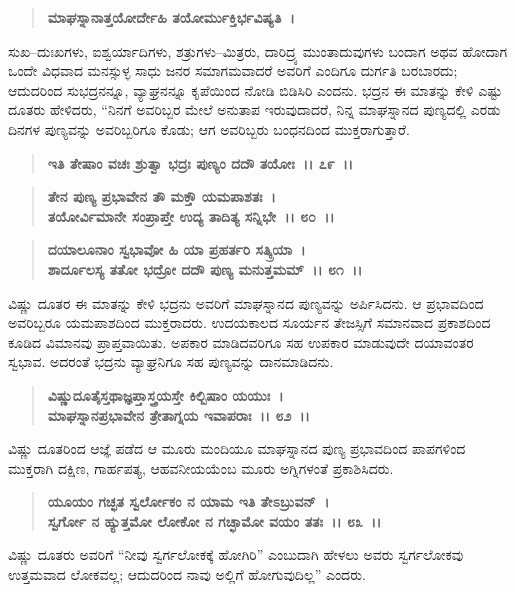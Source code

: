 \begin{verse}
\textbf{ಮಾಘಸ್ನಾನಾತ್ತಯೋರ್ದೇಹಿ ತಯೋರ್ಮುಕ್ತಿರ್ಭವಿಷ್ಯತಿ~।}
\end{verse}

ಸುಖ–ದುಃಖಗಳು, ಐಶ್ವರ್ಯಾದಿಗಳು, ಶತ್ರುಗಳು–ಮಿತ್ರರು, ದಾರಿದ್ರ್ಯ ಮುಂತಾದುವುಗಳು ಬಂದಾಗ ಅಥವ ಹೋದಾಗ ಒಂದೇ ವಿಧವಾದ ಮನಸ್ಸುಳ್ಳ ಸಾಧು ಜನರ ಸಮಾಗಮವಾದರೆ ಅವರಿಗೆ ಎಂದಿಗೂ ದುರ್ಗತಿ ಬರಬಾರದು; ಆದುದರಿಂದ ಸುಭದ್ರನನ್ನೂ, ವ್ಯಾಘ್ರನನ್ನೂ ಕೃಪೆಯಿಂದ ನೋಡಿ ಬಿಡಿಸಿರಿ ಎಂದನು. ಭದ್ರನ ಈ ಮಾತನ್ನು ಕೇಳಿ ಎಷ್ಟು ದೂತರು ಹೇಳಿದರು, “ನಿನಗೆ ಅವರಿಬ್ಬರ ಮೇಲೆ ಅನುತಾಪ ಇರುವುದಾದರೆ, ನಿನ್ನ ಮಾಘಸ್ನಾನದ ಪುಣ್ಯದಲ್ಲಿ ಎರಡು ದಿನಗಳ ಪುಣ್ಯವನ್ನು ಅವರಿಬ್ಬರಿಗೂ ಕೊಡು; ಆಗ ಅವರಿಬ್ಬರು ಬಂಧನದಿಂದ ಮುಕ್ತರಾಗುತ್ತಾರೆ.

\begin{verse}
\textbf{ಇತಿ ತೇಷಾಂ ವಚಃ ಶ್ರುತ್ವಾ ಭದ್ರಃ ಪುಣ್ಯಂ ದದೌ ತಯೋಃ~।। ೭೯~।।} 
\end{verse}

\begin{verse}
\textbf{ತೇನ ಪುಣ್ಯ ಪ್ರಭಾವೇನ ತೌ ಮಕ್ತೌ ಯಮಪಾಶತಃ~।}\\\textbf{ತಯೋರ್ವಿಮಾನೇ ಸಂಪ್ರಾಪ್ತೇ ಉದ್ಯ ತಾದಿತ್ಯ ಸನ್ನಿಭೇ~।। ೮೦~।। }
\end{verse}

\begin{verse}
\textbf{ದಯಾಲೂನಾಂ ಸ್ವಭಾವೋ ಹಿ ಯಾ ಪ್ರಹರ್ತರಿ ಸತ್ಕ್ರಿಯಾ~।}\\\textbf{ಶಾರ್ದೂಲಸ್ಯ ತತೋ ಭದ್ರೋ ದದೌ ಪುಣ್ಯ ಮನುತ್ತಮಮ್~।। ೮೧~।।}
\end{verse}

ವಿಷ್ಣು ದೂತರ ಈ ಮಾತನ್ನು ಕೇಳಿ ಭದ್ರನು ಅವರಿಗೆ ಮಾಘಸ್ನಾನದ ಪುಣ್ಯವನ್ನು ಅರ್ಪಿಸಿದನು. ಆ ಪ್ರಭಾವದಿಂದ ಅವರಿಬ್ಬರೂ ಯಮಪಾಶದಿಂದ ಮುಕ್ತರಾದರು. ಉದಯಕಾಲದ ಸೂರ್ಯನ ತೇಜಸ್ಸಿಗೆ ಸಮಾನವಾದ ಪ್ರಕಾಶದಿಂದ ಕೂಡಿದ ವಿಮಾನವು ಪ್ರಾಪ್ತವಾಯಿತು. ಅಪಕಾರ ಮಾಡಿದವರಿಗೂ ಸಹ ಉಪಕಾರ ಮಾಡುವುದೇ ದಯಾವಂತರ ಸ್ವಭಾವ. ಅದರಂತೆ ಭದ್ರನು ವ್ಯಾಘ್ರನಿಗೂ ಸಹ ಪುಣ್ಯವನ್ನು ದಾನಮಾಡಿದನು.

\begin{verse}
\textbf{ವಿಷ್ಣುದೂತೈಸ್ತಥಾಜ್ಞಪ್ತಾಸ್ತ್ರಯಸ್ತೇ ಕಿಲ್ಬಿಷಾಂ ಯಯುಃ~।}\\\textbf{ಮಾಘಸ್ನಾನಪ್ರಭಾವೇನ ತ್ರೇತಾಗ್ನಯ ಇವಾಪರಾಃ~।। ೮೨~।।}
\end{verse}

ವಿಷ್ಣು ದೂತರಿಂದ ಆಜ್ಞೆ ಪಡೆದ ಆ ಮೂರು ಮಂದಿಯೂ ಮಾಘಸ್ನಾನದ ಪುಣ್ಯ ಪ್ರಭಾವದಿಂದ ಪಾಪಗಳಿಂದ ಮುಕ್ತರಾಗಿ ದಕ್ಷಿಣ, ಗಾರ್ಹಪತ್ಯ, ಆಹವನೀಯಯೆಂಬ ಮೂರು ಅಗ್ನಿಗಳಂತೆ ಪ್ರಕಾಶಿಸಿದರು.

\begin{verse}
\textbf{ಯೂಯಂ ಗಚ್ಛತ ಸ್ವರ್ಲೋಕಂ ನ ಯಾಮ ಇತಿ ತೇಽಬ್ರುವನ್~।}\\\textbf{ಸ್ವರ್ಗೋ ನ ಹ್ಯುತ್ತಮೋ ಲೋಕೋ ನ ಗಚ್ಛಾಮೋ ವಯಂ ತತಃ~।। ೮೩~।।}
\end{verse}

ವಿಷ್ಣು ದೂತರು ಅವರಿಗೆ “ನೀವು ಸ್ವರ್ಗಲೋಕಕ್ಕೆ ಹೋಗಿರಿ” ಎಂಬುದಾಗಿ ಹೇಳಲು ಅವರು ಸ್ವರ್ಗಲೋಕವು ಉತ್ತಮವಾದ ಲೋಕವಲ್ಲ; ಆದುದರಿಂದ ನಾವು ಅಲ್ಲಿಗೆ ಹೋಗುವುದಿಲ್ಲ” ಎಂದರು.

